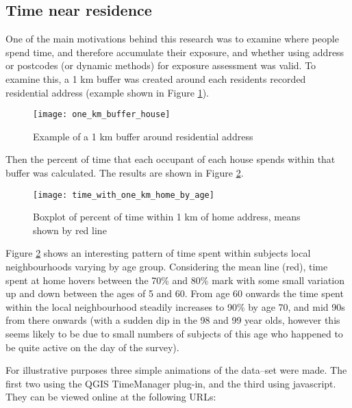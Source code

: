 \subsection{Time near residence}
\label{sec:time_near_residence}

One of the main motivations behind this research was to examine where people spend time, and therefore accumulate their exposure, and whether using address or postcodes (or dynamic methods) for exposure assessment was valid. To examine this, a 1 km buffer was created around each residents recorded residential address (example shown in Figure \ref{fig:one_km_buffer_house}).

\begin{figure}[H]
\centering
\texttt{[image: one\_km\_buffer\_house]}
\caption{Example of a 1 km buffer around residential address}
\label{fig:one_km_buffer_house}
\end{figure}

Then the percent of time that each occupant of each house spends within that buffer was calculated. The results are shown in Figure \ref{fig:time_with_one_km_home_by_age}.

\begin{landscape}

\begin{figure}[H]
\centering
\texttt{[image: time\_with\_one\_km\_home\_by\_age]}
\caption{Boxplot of percent of time within 1 km of home address, means shown by red line}
\label{fig:time_with_one_km_home_by_age}
\end{figure}

\end{landscape}

Figure \ref{fig:time_with_one_km_home_by_age} shows an interesting pattern of time spent within subjects local neighbourhoods varying by age group. Considering the mean line (red), time spent at home hovers between the 70\% and 80\% mark with some small variation up and down between the ages of 5 and 60. From age 60 onwards the time spent within the local neighbourhood steadily increases to 90\% by age 70, and mid 90s from there onwards (with a sudden dip in the 98 and 99 year olds, however this seems likely to be due to small numbers of subjects of this age who happened to be quite active on the day of the survey).

For illustrative purposes three simple animations of the data--set were made. The first two using the QGIS TimeManager plug-in, and the third using javascript. They can be viewed online at the following URLs:

